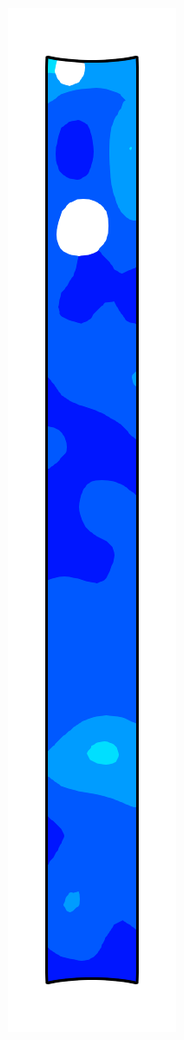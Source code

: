 \begin{figure}[!htb]
  \centering
  \begin{subfigure}{0.08\textwidth}
    \centering
    \includegraphics[width=\textwidth]{Chapter5/figures/spallation/ep_1}

\end{subfigure}
\end{figure}
